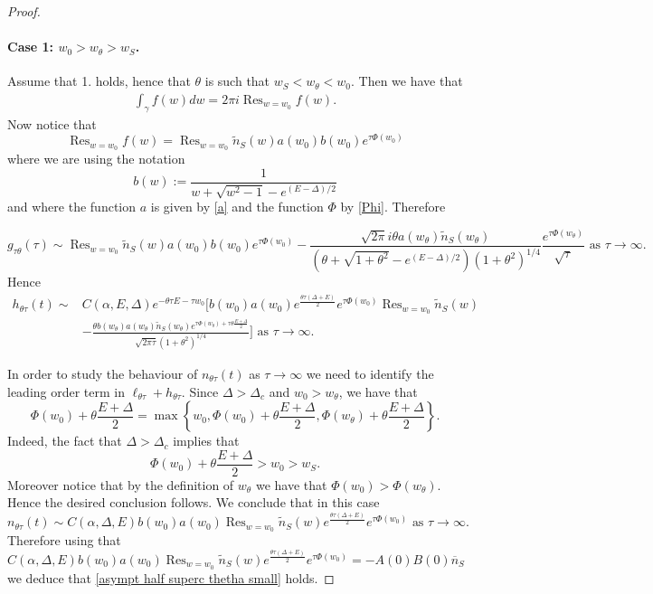 \documentclass{article}
\numberwithin{equation}{section}
\theoremstyle{plain}
\begin{document}
\begin{proof}
\paragraph{Case 1: $w_0 > w_\theta > w_S  $.}
Assume that 1. holds, hence that $\theta $ is such that $w_S < w_\theta < w_0 $.  
Then we have that 
\begin{align*}
 \int_{\gamma}f(w) dw=  2 \pi i  \operatorname{Res}_{w=w_0} f(w).
\end{align*} 
Now notice that
\[
\operatorname{Res}_{w=w_0} f(w) = \operatorname{Res}_{w=w_0} \tilde{n}_S (w)  a(w_0) b(w_0) e^{\tau \Phi (w_0) } 
\]
where we are using the notation 
\[ 
b(w):= \frac{1}{w+\sqrt{w^2-1}-e^{(E-\Delta)/2}}
\] 
and where the function $a$ is given by \eqref{a} and the function $\Phi$ by \eqref{Phi}. 
Therefore 

\[
g_{\tau \theta } (\tau)  \sim \operatorname{Res}_{w=w_0} \tilde{n}_S (w)  a(w_0) b(w_0) e^{\tau \Phi (w_0) }  -  \frac{    \sqrt{2\pi} i \theta a(w_\theta ) \tilde{n}_S(w_\theta )}{(\theta+ \sqrt{1+ \theta^2 } - e^{(E-\Delta)/2}) (1+\theta^2)^{1/4}} \frac{ e^{ \tau \Phi(w_\theta ) }}{\sqrt{\tau}} \text{ as } \tau \to \infty. 
\]
Hence
\begin{align*}
        h_{\theta \tau } (t) \sim &C(\alpha, E, \Delta)e^{ - \theta \tau E - \tau w_0 } [   b(w_0)   a(w_0) e^{ \frac{ \theta \tau (\Delta +E) }{2}}  e^{\tau   \Phi(w_0)} \operatorname{Res}_{w=w_0} \tilde{n}_S (w) \\
        &- \frac{   \theta  b(w_\theta)   a(w_\theta ) \tilde{n}_S(w_\theta )  
        e^{ \tau \Phi(w_\theta ) + \tau\theta  \frac{E+ \Delta}{2}}
        }{\sqrt{2 \pi \tau } (1+\theta^2)^{1/4}} ]   \text{ as } \tau \to \infty. 
\end{align*}

In order to study the behaviour of  $n_{\theta \tau}(t)$ as $\tau \to \infty $ we need to identify the leading order term in $\ell_{\theta \tau}+ h_{\theta \tau}$.
Since $\Delta > \Delta_c $ and $w_0 > w_\theta  $, we have that
\[  
\Phi(w_0) + \theta\frac{E+ \Delta }{2}=\max\left\{ w_0 , \Phi(w_0) + \theta\frac{E+ \Delta }{2}, \Phi(w_\theta) + \theta \frac{E+ \Delta }{2}  \right\}. 
\] 
Indeed, the fact that $\Delta > \Delta_c $ implies that 
\[
\Phi(w_0) + \theta\frac{E+ \Delta }{2} >w_0 > w_S. 
\]
Moreover notice that by the definition of $w_\theta $ we have that  $\Phi(w_0) > \Phi(w_\theta)$. Hence the desired conclusion follows. We conclude that in this case 
\begin{equation} \label{asympt n 1b}
    n_{\theta \tau} (t) \sim C(\alpha, \Delta, E)   b(w_0) a(w_0) \operatorname{Res}_{w=w_0} \tilde{n}_S (w)e^{ \frac{ \theta \tau (\Delta + E) }{2}}  e^{\tau   \Phi(w_0)}  \text{ as } \tau \to \infty. 
\end{equation}
Therefore using that 
\[ 
C(\alpha, \Delta, E)   b(w_0) a(w_0) \operatorname{Res}_{w=w_0} \tilde{n}_S (w)e^{ \frac{ \theta \tau (\Delta + E) }{2}}  e^{\tau   \Phi(w_0)} = -  A(0) B(0) \overline{n}_S
\]
we deduce that \eqref{asympt half superc thetha small} holds. 


\end{proof}
\end{document}
